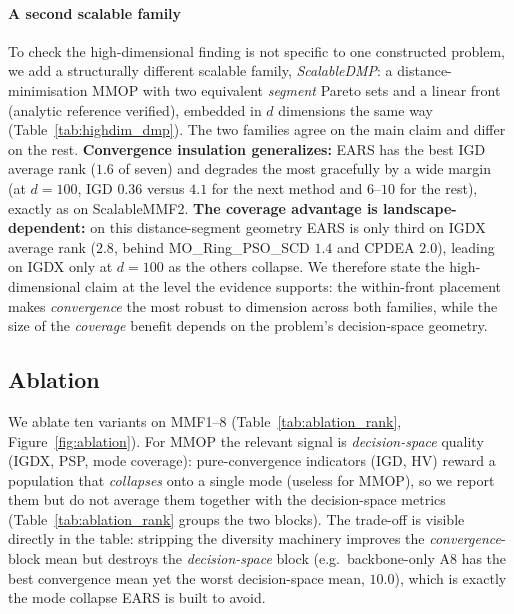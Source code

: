 

\paragraph{A second scalable family} To check the high-dimensional finding is not specific to one
constructed problem, we add a structurally different scalable family, \emph{ScalableDMP}: a
distance-minimisation MMOP with two equivalent \emph{segment} Pareto sets and a linear front
(analytic reference verified), embedded in $d$ dimensions the same way
(Table~\ref{tab:highdim_dmp}). The two families agree on the main claim and differ on the rest. \textbf{Convergence insulation generalizes:} EARS has the best IGD average
rank ($1.6$ of seven) and degrades the most gracefully by a wide margin (at $d{=}100$, IGD $0.36$
versus $4.1$ for the next method and $6$--$10$ for the rest), exactly as on ScalableMMF2.
\textbf{The coverage advantage is landscape-dependent:} on this distance-segment geometry EARS is
only third on IGDX average rank ($2.8$, behind MO\_Ring\_PSO\_SCD $1.4$ and CPDEA $2.0$), leading
on IGDX only at $d{=}100$ as the others collapse. We therefore state the high-dimensional claim at
the level the evidence supports: the within-front placement makes \emph{convergence} the most
robust to dimension across both families, while the size of the \emph{coverage} benefit depends on
the problem's decision-space geometry.



\subsection{Ablation}
\label{sec:ablation}
We ablate ten variants on MMF1--8 (Table~\ref{tab:ablation_rank}, Figure~\ref{fig:ablation}).
For MMOP the relevant signal is \emph{decision-space} quality (IGDX, PSP, mode coverage):
pure-convergence indicators (IGD, HV) reward a population that \emph{collapses} onto a single
mode (useless for MMOP), so we report them but do not average them together with the
decision-space metrics (Table~\ref{tab:ablation_rank} groups the two blocks). The trade-off is
visible directly in the table: stripping the diversity machinery improves the
\emph{convergence}-block mean but destroys the \emph{decision-space} block (e.g.\ backbone-only
A8 has the best convergence mean yet the worst decision-space mean, $10.0$), which is exactly
the mode collapse EARS is built to avoid.

